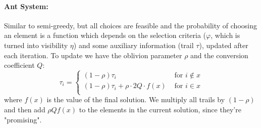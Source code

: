 \documentclass{article}
\begin{document}
	\paragraph{Ant System:} Similar to semi-greedy, but all choices are feasible and the probability of choosing an element is a function which depends on the selection criteria ($\varphi$, which is turned into visibility $\eta$) and some auxiliary information (trail $\tau$), updated after each iteration. To update we have the oblivion parameter $\rho$ and the conversion coefficient $Q$: 
	$$ 
	\tau_i = \begin{cases}
		(1 - \rho) \tau_i & \text{ for } i \notin x \\
		(1 - \rho) \tau_i + \rho \cdot2 Q \cdot f(x) & \text{ for } i \in x \\
	\end{cases}
	$$
	where $f(x)$ is the value of the final solution. We multiply all trails by $(1-\rho)$ and then add $\rho Q f(x)$ to the elements in the current solution, since they're "promising".\\
	
\end{document}
